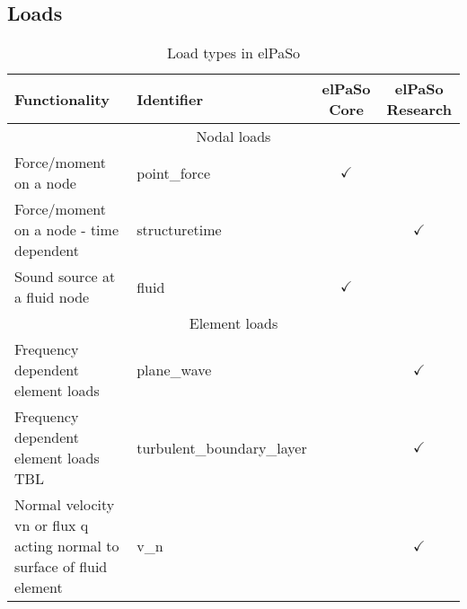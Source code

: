 \subsection{Loads}

\begin{table}[H]
    \centering
    \caption{Load types in elPaSo}
    \begin{tabular}{p{6cm}lcc}
        \hline
    Functionality                                                          & Identifier                 & \multicolumn{1}{c}{elPaSo Core} & \multicolumn{1}{c}{elPaSo Research} \\ \hline
    \multicolumn{4}{c}{Nodal loads}                                                                                                                                             \\ \hline
    Force/moment on a node                                                 & point\_force               & $\checkmark$                    &                                     \\
    Force/moment on a node - time dependent                                & structuretime              &                                 & $\checkmark$                        \\
    Sound source at a fluid node                                           & fluid                      & $\checkmark$                    &                                     \\ \hline
    \multicolumn{4}{c}{Element loads}                                                                                                                                           \\ \hline
    Frequency dependent element loads                                      & plane\_wave                &                                 & $\checkmark$                        \\
    Frequency dependent element loads TBL                                  & turbulent\_boundary\_layer &                                 & $\checkmark$                        \\
    Normal velocity vn or flux q acting normal to surface of fluid element & v\_n                       &                                 & $\checkmark$                        \\ \hline
    \end{tabular}
\end{table}

